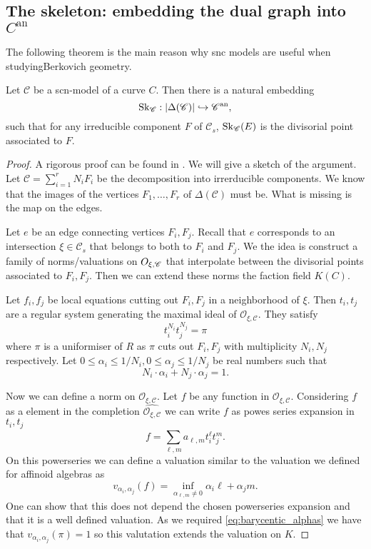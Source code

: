\subsection{The skeleton: embedding the dual graph into $C^{\mathrm{an}}$}\label{sec:skeleton}
The following theorem is the main reason why snc models are useful when studyingBerkovich geometry. 
\begin{theorem}
	Let $\mathscr C$ be a scn-model of a curve $C$. 
	Then there is a natural embedding \[
		\operatorname{Sk}_{\mathscr C}:|\Delta(\mathscr C)| \hookrightarrow \mathscr C{}^{\text{an}}
	,\]
	such that for any irreducible component $F$ of $\mathscr C_s$,  $\operatorname{Sk}_{\mathscr C}(E)$ is the divisorial point associated to $F$. 
\end{theorem}
\begin{proof}
	A rigorous proof can be found in \cite[3.1.4]{mustataWeightFunctionsNonArchimedean2015}.
	We will give a sketch of the argument. 
	Let $\mathscr C = \sum_{i= 1}^{r} N_i F_i$ be the decomposition into irrerducible components. 
	We know that the images of the vertices $F_1, \ldots, F_r$ of $\Delta(\mathscr C)$ must be.
	What is missing is the map on the edges. 

	Let $e$ be an edge connecting vertices $F_i, F_j$. 
	Recall that $e$ corresponds to an intersection $\xi \in \mathscr C_s$ that belongs to both to $F_i$ and $F_j$. 
	We the idea is construct a family of norms/valuations on $\mathscr \mathcal{O}_{\xi, \mathscr C}$ that interpolate between the divisorial points associated to $F_i, F_j$. Then we can extend these norms the faction field $K(C)$. 

	Let $f_i, f_j$ be local equations cutting out $F_i, F_j$ in a neighborhood of  $\xi$. 
	Then $t_i, t_j$ are a regular system generating the maximal ideal of $\mathcal{O}_{\xi, \mathscr C}. $ 
	They satisfy \[
		t_i ^{N_i} t _j^{N_j} = \pi
	\] 
	where $\pi$ is a uniformiser of $ R$ as $\pi$ cuts out $F_i, F_j$ with multiplicity $N_i, N_j$ respectively.  
	Let $0 \le \alpha_i \le 1 / N_i,   0 \le \alpha_j \le 1 / N_j$ be real numbers such that \begin{equation}\label{eq:barycentic_alphas}
		N_i\cdot \alpha_i + N_j \cdot \alpha_j = 1
	.\end{equation}
	
	Now we can define a norm on $\mathcal{O}_{\xi, \mathscr C}$. 
	Let  $f$ be any function in $\mathcal{O}_{\xi, \mathscr C}$. 
	Considering $f$ as a element in the completion $\hat{\mathcal{O}_{\xi, \mathscr C}}$ we can write $f$ as powes series expansion in $t_i, t_j$  \[
		f = \sum_{\ell, m}^{} a_{\ell, m} t_i ^{\ell} t_j^{m}
	.\] 
	On this powerseries we can define a valuation similar to the valuation we defined  for affinoid algebras as \[
		v_{\alpha_i, \alpha_j}(f) = \inf_{\alpha_{\ell, m} \ne 0}{\alpha_i \ell + \alpha_j m}
	.\] 
	One can show that this does not depend the chosen powerseries expansion and that it is a well defined valuation. 
	As we required \eqref{eq:barycentic_alphas} we have that  $v_{\alpha_i, \alpha_j}(\pi) = 1$ so this valutation extends the valuation on $K$. 
\end{proof}
